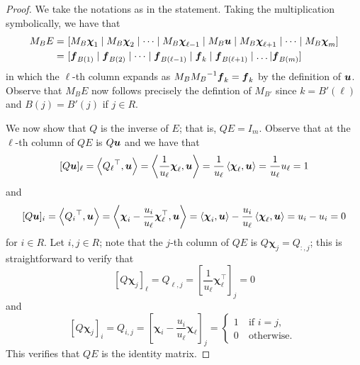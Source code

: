 \begin{proof}
We take the notations as in the statement. Taking the multiplication symbolically, we have that 
\[ \begin{split}
M_B E = ~& [ M_B \boldsymbol\chi_1 \mid M_B \boldsymbol\chi_2 \mid \dots \mid M_B \boldsymbol\chi_{\ell-1} \mid M_B {\boldsymbol u} \mid M_B \boldsymbol\chi_{\ell+1} \mid \dots \mid M_B \boldsymbol\chi_m] \\
= ~&  [{\boldsymbol f}_{B(1)} \mid {\boldsymbol f}_{B(2)}\mid \dots \mid {\boldsymbol f}_{B(\ell-1)} \mid {\boldsymbol f}_k \mid {\boldsymbol f}_{B(\ell + 1)} \mid \dots | {\boldsymbol f}_{B(m)}] \\
\end{split}\]
in which the $\ell$-th column expands as $M_B {M_B}^{-1} {\boldsymbol f}_{k} =  {\boldsymbol f}_{k}$ by the definition of ${\boldsymbol u}$. Observe that $M_B E$ now follows precisely the defintion of $M_{B'}$ since $k = B'(\ell)$ and $B(j) = B'(j)$ if $j\in R$. 

We now show that $Q$ is the inverse of $E$; that is, $QE = I_m$. Observe that at the $\ell$-th column of $QE$ is $Q{\boldsymbol u}$ and we have that 
\[ [Q{\boldsymbol u}]_\ell = \left\langle{Q_\ell}^\top, {\boldsymbol u}\right\rangle = \left\langle\frac{1}{u_\ell}\boldsymbol\chi_\ell, {\boldsymbol u}\right\rangle = \frac{1}{u_\ell}\left\langle\boldsymbol\chi_\ell, {\boldsymbol u}\right\rangle = \frac{1}{u_\ell} u_{\ell} = 1 \]
and 
\[ [Q{\boldsymbol u}]_i = \left\langle{Q_i}^\top, {\boldsymbol u}\right\rangle = \left\langle\boldsymbol\chi_i - \frac{u_i}{u_{\ell}}\boldsymbol\chi_{\ell}^\top  , {\boldsymbol u}\right\rangle = \left\langle\boldsymbol\chi_i , {\boldsymbol u}\right\rangle -\frac{u_i}{u_{\ell}} \left\langle \boldsymbol\chi_{\ell}, {\boldsymbol u}\right\rangle = u_i - u_i = 0 \] for $i\in R$. Let $i, j\in R$; note that the $j$-th column of $QE$ is $Q\bm\chi_j  =  Q_{:, j}$; this is straightforward to verify that
\[  [Q\bm\chi_j]_\ell = Q_{\ell, j} = \left[  \frac{1}{u_\ell}\bm\chi_\ell^\top   \right]_j = 0   \]
and 
\[  [Q\bm\chi_j]_i = Q_{i, j} = \left[\bm\chi_i - \frac{u_i}{u_{\ell}} \bm\chi_{\ell}\right]_j = \left\{\begin{array}{ll}
1 &~\text{if $i = j$, }\\
0 &~\text{otherwise. }
\end{array} \right. \]
This verifies that $QE$ is the identity matrix. 
\end{proof}

